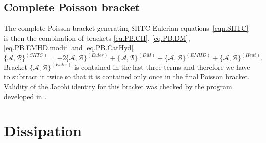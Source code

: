 \documentclass[twoside]{article}
\newcommand{\rr}{{\boldsymbol{r}}}
\newcommand{\AF}{\mathscr{A}}
\newcommand{\BF}{\mathscr{B}}
\newcommand{\pd}{\partial}
\begin{document}
\subsection{Complete Poisson bracket}
The complete Poisson bracket generating SHTC Eulerian 
equations~\eqref{eqn.SHTC} is then the 
combination of brackets \eqref{eq.PB.CH}, \eqref{eq.PB.DM}, 
\eqref{eq.PB.EMHD.modif} 
and \eqref{eq.PB.CatHyd},
\begin{equation}\label{eq.PB.SHTC}
\{\AF,\BF\}^{(SHTC)} = -2\{\AF,\BF\}^{(Euler)} + \{\AF,\BF\}^{(DM)} + 
\{\AF,\BF\}^{(EMHD)} + \{\AF,\BF\}^{(Heat)}.
\end{equation}
Bracket $ \{\AF,\BF\}^{(Euler)} $ is contained in the last three terms and therefore we have to subtract it twice so that it is contained only once in the final Poisson bracket.
Validity of the Jacobi identity for this bracket was checked by the program 
developed in \cite{kroeger2010}.


\section{Dissipation}\label{sec.Dissipation}
\end{document}

